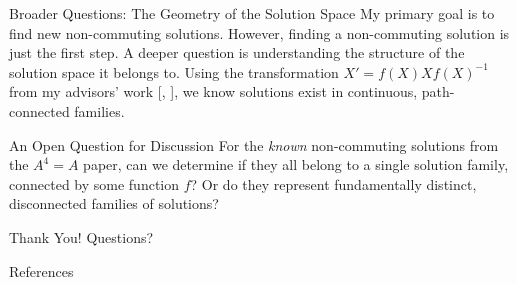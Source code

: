 \documentclass{beamer}
\begin{document}
\begin{frame}{Broader Questions: The Geometry of the Solution Space}
  My primary goal is to find new non-commuting solutions. However, finding a non-commuting solution is just the first step. A deeper question is understanding the structure of the solution space it belongs to.
  \vfill
  Using the transformation $X' = f(X)Xf(X)^{-1}$ from my advisors' work [\citeauthor{intrinsic-structure}, \citeyear{intrinsic-structure}], we know solutions exist in continuous, path-connected families.
  \vfill
  \begin{alertblock}{An Open Question for Discussion}
  For the \textit{known} non-commuting solutions from the $A^4=A$ paper, can we determine if they all belong to a single solution family, connected by some function $f$? Or do they represent fundamentally distinct, disconnected families of solutions?
  \end{alertblock}
\end{frame}


\begin{frame}
  \begin{center}
    \Huge Thank You!
    \vfill
    Questions?
  \end{center}
\end{frame}

\begin{frame}[allowframebreaks]{References}
  
\end{frame}
\end{document}
